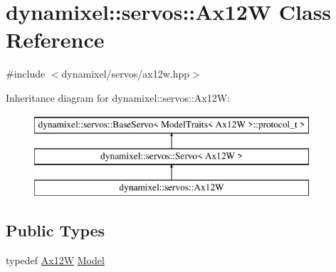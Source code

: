 \hypertarget{classdynamixel_1_1servos_1_1_ax12_w}{}\section{dynamixel\+:\+:servos\+:\+:Ax12W Class Reference}
\label{classdynamixel_1_1servos_1_1_ax12_w}


{\ttfamily \#include $<$dynamixel/servos/ax12w.\+hpp$>$}

Inheritance diagram for dynamixel\+:\+:servos\+:\+:Ax12W\+:\begin{figure}[H]
\begin{center}
\leavevmode
\includegraphics[height=3.000000cm]{classdynamixel_1_1servos_1_1_ax12_w}
\end{center}
\end{figure}
\subsection*{Public Types}
\begin{DoxyCompactItemize}
\item 
typedef \hyperlink{classdynamixel_1_1servos_1_1_ax12_w}{Ax12W} \hyperlink{classdynamixel_1_1servos_1_1_ax12_w_ae961bb0cca2e1de1382b97e7d8b41b54}{Model}
\end{DoxyCompactItemize}
